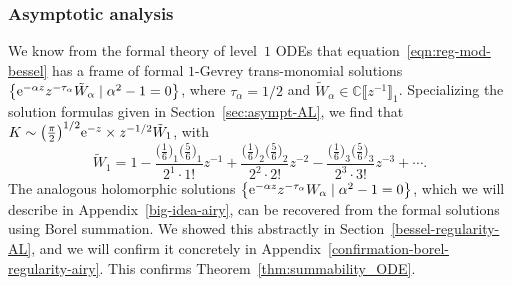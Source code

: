 \documentclass[pdftex]{sigma}
\newcommand{\C}{\mathbb{C}}
\newcommand{\series}[1]{\tilde{#1}}
\numberwithin{equation}{section}
\begin{document}
\subsubsection{Asymptotic analysis}\label{sec:asympt-airy}
%
We know from the formal theory of level~$1$ ODEs that equation~\eqref{eqn:reg-mod-bessel} has a frame of formal $1$-Gevrey trans-monomial solutions
$\big\{ {\rm e}^{-\alpha z} z^{-\tau_\alpha} \series{W}_\alpha \mid \alpha^2 - 1 = 0 \big\}$,
where $\tau_\alpha = 1/2$ and $\series{W}_\alpha\in\C\big\llbracket z^{-1} \big\rrbracket_1$. Specializing the solution formulas given in Section~\ref{sec:asympt-AL}, we find that $\smash{K \sim \bigl(\frac{\pi}{2}\bigr)^{1/2}} {\rm e}^{-z} \allowbreak\times z^{-1/2} \series{W}_1$, with
\[%
\series{W}_1 = 1 - \frac{\bigl(\frac{1}{6}\bigr)_1 \bigl(\frac{5}{6}\bigr)_1}{2^1 \cdot 1!} z^{-1} + \frac{\bigl(\frac{1}{6}\bigr)_2 \bigl(\frac{5}{6}\bigr)_2}{2^2 \cdot 2!} z^{-2} - \frac{\bigl(\frac{1}{6}\bigr)_3 \bigl(\frac{5}{6}\bigr)_3}{2^3 \cdot 3!} z^{-3} + \cdots.
\]
%
The analogous holomorphic solutions
$ \big\{ {\rm e}^{-\alpha z} z^{-\tau_\alpha} W_\alpha \mid \alpha^2 - 1 = 0 \big\}$,
which we will describe in Appendix~\ref{big-idea-airy}, can be recovered from the formal solutions using Borel summation. We showed this abstractly in Section~\ref{bessel-regularity-AL}, and we will confirm it concretely in Appendix~\ref{confirmation-borel-regularity-airy}. This confirms Theorem~\ref{thm:summability_ODE}.
\end{document}
